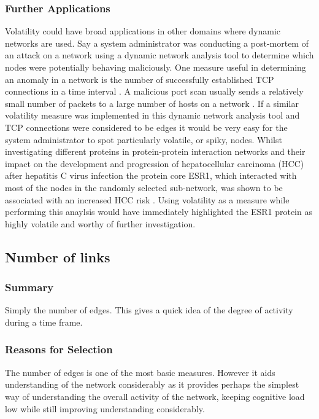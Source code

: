 \subsubsection{Further Applications}
Volatility could have broad applications in other domains where dynamic networks are used. 
\newline\newline
Say a system administrator was conducting a post-mortem of an attack on a network using a dynamic network analysis tool to determine which nodes were potentially behaving maliciously. One measure useful in determining an anomaly in a network is the number of successfully established TCP connections in a time interval \cite{fnpfid}. A malicious port scan usually sends a relatively small number of packets to a large number of hosts on a network \cite{fnpfid}. If a similar volatility measure was implemented in this dynamic network analysis tool and TCP connections were considered to be edges it would be very easy for the system administrator to spot particularly volatile, or spiky, nodes.
\newline\newline
Whilst investigating different proteins in protein-protein interaction networks and their impact on the development and progression of hepatocellular carcinoma (HCC) after hepatitis C virus infection the protein core ESR1, which interacted with most of the nodes in the randomly selected sub-network, was shown to be associated with an increased HCC risk \cite{acaotdbnihih}. Using volatility as a measure while performing this anaylsis would have immediately highlighted the ESR1 protein as highly volatile and worthy of further investigation.

\subsection{Number of links}
\subsubsection{Summary}
Simply the number of edges. This gives a quick idea of the degree of activity during a time frame. 

\subsubsection{Reasons for Selection}
The number of edges is one of the most basic measures. However it aids understanding of the network considerably as it provides perhaps the simplest way of understanding the overall activity of the network, keeping cognitive load low while still improving understanding considerably.

